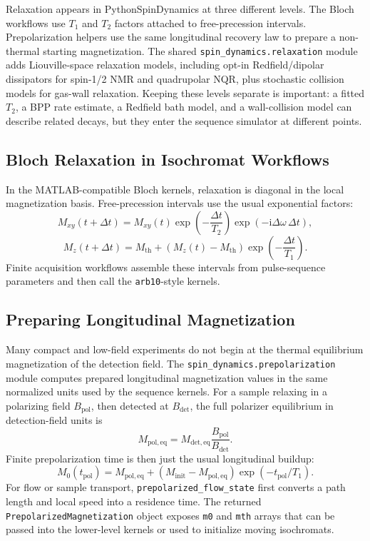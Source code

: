 \documentclass[11pt,oneside]{report}
\newcommand{\code}[1]{\texttt{#1}}
\newcommand{\ii}{\mathrm{i}}
\begin{document}
Relaxation appears in PythonSpinDynamics at three different levels. The Bloch
workflows use \(T_1\) and \(T_2\) factors attached to free-precession intervals.
Prepolarization helpers use the same longitudinal recovery law to prepare a
non-thermal starting magnetization. The shared
\code{spin\_dynamics.relaxation} module adds Liouville-space relaxation models,
including opt-in Redfield/dipolar dissipators for spin-1/2 NMR and quadrupolar
NQR, plus stochastic collision models for gas-wall relaxation. Keeping these
levels separate is important: a fitted \(T_2\), a BPP rate estimate, a Redfield
bath model, and a wall-collision model can describe related decays, but they
enter the sequence simulator at different points.

\subsection{Bloch Relaxation in Isochromat Workflows}

In the MATLAB-compatible Bloch kernels, relaxation is diagonal in the local
magnetization basis. Free-precession intervals use the usual exponential
factors:
\[
  M_{xy}(t+\Delta t) =
    M_{xy}(t)\exp\left(-\frac{\Delta t}{T_2}\right)
    \exp(-\ii \Delta\omega\,\Delta t),
\]
\[
  M_z(t+\Delta t) =
    M_{\mathrm{th}} +
    \left(M_z(t)-M_{\mathrm{th}}\right)
    \exp\left(-\frac{\Delta t}{T_1}\right).
\]
Finite acquisition workflows assemble these intervals from pulse-sequence
parameters and then call the \code{arb10}-style kernels.

\subsection{Preparing Longitudinal Magnetization}

Many compact and low-field experiments do not begin at the thermal equilibrium
magnetization of the detection field. The \code{spin\_dynamics.prepolarization}
module computes prepared longitudinal magnetization values in the same
normalized units used by the sequence kernels. For a sample relaxing in a
polarizing field \(B_{\mathrm{pol}}\), then detected at \(B_{\mathrm{det}}\),
the full polarizer equilibrium in detection-field units is
\[
  M_{\mathrm{pol,eq}} =
    M_{\mathrm{det,eq}}\frac{B_{\mathrm{pol}}}{B_{\mathrm{det}}}.
\]
Finite prepolarization time is then just the usual longitudinal buildup:
\[
  M_0(t_{\mathrm{pol}}) =
    M_{\mathrm{pol,eq}} +
    \left(M_{\mathrm{init}}-M_{\mathrm{pol,eq}}\right)
    \exp\left(-t_{\mathrm{pol}}/T_1\right).
\]
For flow or sample transport, \code{prepolarized\_flow\_state} first converts a
path length and local speed into a residence time. The returned
\code{PrepolarizedMagnetization} object exposes \code{m0} and \code{mth} arrays
that can be passed into the lower-level kernels or used to initialize moving
isochromats.
\end{document}
